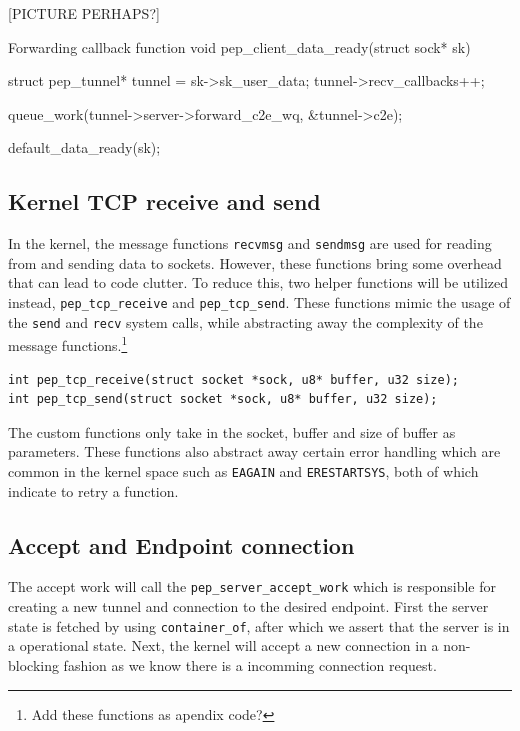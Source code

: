 \documentclass[a4paper,english, 11pt]{report}
\begin{document}
[PICTURE PERHAPS?]

\begin{autonumlstlisting}[label=lst:pep_forward_callback]{Forwarding callback function}
void pep_client_data_ready(struct sock* sk)
{
	struct pep_tunnel* tunnel = sk->sk_user_data;
	tunnel->recv_callbacks++;
        
	queue_work(tunnel->server->forward_c2e_wq, &tunnel->c2e);
        
	default_data_ready(sk);
}
\end{autonumlstlisting}

\subsection{Kernel TCP receive and send}
In the kernel, the message functions \verb|recvmsg| and \verb|sendmsg| are used for reading from and sending data to sockets. However, these functions bring some overhead that can lead to code clutter. To reduce this, two helper functions will be utilized instead, \verb|pep_tcp_receive| and \verb|pep_tcp_send|. These functions mimic the usage of the \verb|send| and \verb|recv| system calls, while abstracting away the complexity of the message functions.\footnote{Add these functions as apendix code?}

\begin{verbatim}
int pep_tcp_receive(struct socket *sock, u8* buffer, u32 size);
int pep_tcp_send(struct socket *sock, u8* buffer, u32 size);
\end{verbatim}

The custom functions only take in the socket, buffer and size of buffer as parameters. These functions also abstract away certain error handling which are common in the kernel space such as \verb|EAGAIN| and \verb|ERESTARTSYS|, both of which indicate to retry a function.

\subsection{Accept and Endpoint connection}
The accept work will call the \verb|pep_server_accept_work| which is responsible for creating a new tunnel and connection to the desired endpoint. First the server state is fetched by using \verb|container_of|, after which we assert that the server is in a operational state. Next, the kernel will accept a new connection in a non-blocking fashion as we know there is a incomming connection request.\\
\end{document}
